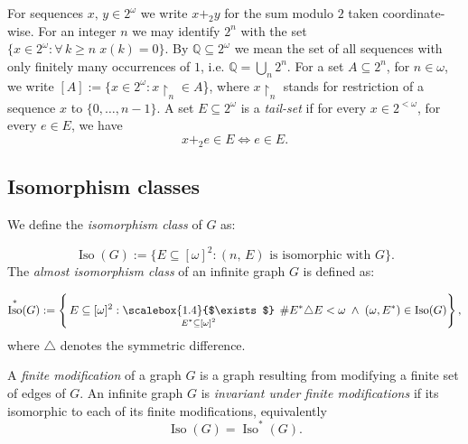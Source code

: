 \documentclass{amsart}
\theoremstyle{plain}
\theoremstyle{definition}
\theoremstyle{remark}
\numberwithin{equation}{section}
\DeclareMathOperator{\iso}{Iso}
\newcommand{\s}{\subseteq}
\begin{document}
For sequences $x,\, y \in 2^\omega$ we write $x+_2y$ for the sum modulo $2$ taken coordinate-wise.
For an integer $n$ we may identify $2^n$ with the set $\{x \in 2^\omega :
\forall \, k\geqslant n \; x(k)=0\}$. By $\mathbb Q \s 2^\omega$ we mean the set of all sequences with only finitely many occurrences of $1$, i.e. $\mathbb Q=\bigcup_n 2^n$.
For a set $A \s 2^n$, for $n\in\omega$, we write $[A]:=\{x \in  
2^\omega : x \restriction_n \in A$\}, where $x \restriction_n$ stands for restriction of a sequence $x$ to $\{0,\ldots,n-1\}$. A set $E \s 2^\omega$ is a \emph{tail-set} if for every $x \in 2^{<\omega}$, for every $e \in E$, we have
\[
x+_2 e \in E\iff e \in E.
\]

\subsection{Isomorphism classes}
We define the \emph{isomorphism class} of $G$ as:

\[
\iso(G):=\{E \s [\omega]^2: (n,\,E)\text{ is isomorphic with }G\}.
\]
The \emph{almost isomorphism class} of an infinite graph $G$ is defined as:


\[
\iso^*(G)
:=\left\{\,E \subseteq [\omega]^2 :
\mathop{\scalebox{1.4}{$\exists$}}_{%
  \substack{%
    \scriptstyle E^*\subseteq[\omega]^2
  }%
}
\;\#E^*\triangle E<\omega\;\wedge\;(\omega,E^*)\in\iso(G)
\right\},
\]
where $\triangle$ denotes the symmetric difference. 

A \emph{finite modification} of a graph $G$ is a graph resulting from modifying a finite set of edges of $G$. An infinite graph $G$ is \emph{invariant under finite modifications} if its isomorphic to each of its finite modifications, equivalently
$$\iso(G)=\iso^*(G).$$
\end{document}
